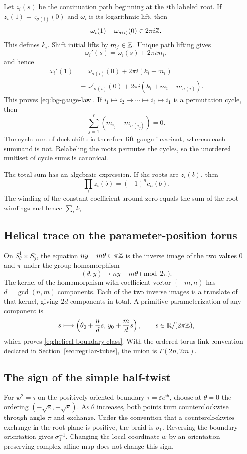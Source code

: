 Let $z_i(s)$ be the continuation path beginning at the $i$th labeled root.  If
$z_i(1)=z_{\sigma(i)}(0)$ and $\omega_i$ is its logarithmic lift, then
\[
 \omega_i(1)-\omega_{\sigma(i)}(0)\in2\pi i\mathbb{Z}.
\]
This defines $k_i$.  Shift initial lifts by $m_j\in\mathbb{Z}$.  Unique path lifting gives
\[
 \omega_i'(s)=\omega_i(s)+2\pi im_i,
\]
and hence
\begin{align*}
 \omega_i'(1)
 &=\omega_{\sigma(i)}(0)+2\pi i(k_i+m_i)\\
 &=\omega'_{\sigma(i)}(0)
   +2\pi i(k_i+m_i-m_{\sigma(i)}).
\end{align*}
This proves \eqref{eq:log-gauge-law}.  If
$i_1\mapsto i_2\mapsto\cdots\mapsto i_\ell\mapsto i_1$ is a permutation cycle,
then
\[
 \sum_{j=1}^\ell
 (m_{i_j}-m_{\sigma(i_j)})=0.
\]
The cycle sum of deck shifts is therefore lift-gauge invariant, whereas each
summand is not.  Relabeling the roots permutes the cycles, so the unordered
multiset of cycle sums is canonical.

The total sum has an algebraic expression.  If the roots are $z_i(b)$, then
\[
 \prod_i z_i(b)=(-1)^n c_n(b).
\]
The winding of the constant coefficient around zero equals the sum of the root
windings and hence $\sum_i k_i$.

\subsection{Helical trace on the parameter-position torus}

On $S^1_\theta\times S^1_y$, the equation
$ny-m\theta\in\pi\mathbb{Z}$ is the inverse image of the two values $0$ and $\pi$ under
the group homomorphism
\[
 (\theta,y)\longmapsto ny-m\theta\pmod{2\pi}.
\]
The kernel of the homomorphism with coefficient vector $(-m,n)$ has
$d=\gcd(n,m)$ components.  Each of the two inverse images is a translate of that
kernel, giving $2d$ components in total.  A primitive parameterization of any
component is
\[
 s\longmapsto
 \left(\theta_0+\frac nds,\,
       y_0+\frac mds\right),
 \qquad s\in\mathbb{R}/(2\pi\mathbb{Z}),
\]
which proves \eqref{eq:helical-boundary-class}.  With the ordered torus-link
convention declared in Section~\ref{sec:regular-tubes}, the union is $T(2n,2m)$.

\subsection{The sign of the simple half-twist}

For $w^2=\tau$ on the positively oriented boundary
$\tau=\varepsilon e^{i\theta}$, choose at $\theta=0$ the ordering
$(-\sqrt\varepsilon,+\sqrt\varepsilon)$.  As $\theta$ increases, both points turn
counterclockwise through angle $\pi$ and exchange.  Under the convention that a
counterclockwise exchange in the root plane is positive, the braid is
$\sigma_1$.  Reversing the boundary orientation gives $\sigma_1^{-1}$.  Changing
the local coordinate $w$ by an orientation-preserving complex affine map does not
change this sign.


